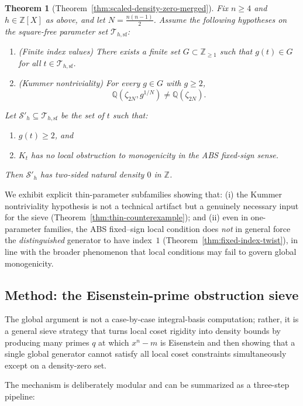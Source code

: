 \documentclass[11pt,letterpaper]{amsart}
\newcommand{\Z}{\mathbb{Z}}
\newcommand{\Q}{\mathbb{Q}}
\theoremstyle{plain}
\newtheorem{theorem}{Theorem}[section]
\theoremstyle{definition}
\theoremstyle{remark}
\theoremstyle{plain}
\begin{document}
\begin{theorem}[Theorem~\ref{thm:scaled-density-zero-merged}]
Fix $n\ge 4$ and $h\in\Z[X]$ as above, and let $N=\frac{n(n-1)}2$.
Assume the following hypotheses on the square-free parameter set $\mathcal{T}_{h,\mathrm{sf}}$:
\begin{enumerate}[label=\textup{(\alph*)}]
\item \textup{(Finite index values)} There exists a finite set $G\subset\Z_{\ge1}$ such that
$g(t)\in G$ for all $t\in\mathcal{T}_{h,\mathrm{sf}}$.
\item \textup{(Kummer nontriviality)} For every $g\in G$ with $g\ge 2$,
\[
\Q(\zeta_{2N},g^{1/N})\neq \Q(\zeta_{2N}).
\]
\end{enumerate}
Let $\mathcal{S}'_{h}\subseteq\mathcal{T}_{h,\mathrm{sf}}$ be the set of $t$ such that:
\begin{enumerate}[label=\textup{(\roman*)}]
\item $g(t)\ge 2$, and
\item $K_t$ has \emph{no} local obstruction to monogenicity in the \textsc{ABS} fixed-sign sense.
\end{enumerate}
Then $\mathcal{S}'_{h}$ has two-sided natural density $0$ in $\Z$.
\end{theorem}

We exhibit explicit thin-parameter subfamilies showing that: (i) the Kummer nontriviality hypothesis is not a technical artifact but a genuinely necessary input for the sieve (Theorem~\ref{thm:thin-counterexample}); and (ii) even in one-parameter families, the \textsc{ABS} fixed--sign local condition does \emph{not} in general force the \emph{distinguished} generator to have index~$1$ (Theorem~\ref{thm:fixed-index-twist}), in line with the broader phenomenon that local conditions may fail to govern global monogenicity.


 

\subsection{Method: the Eisenstein-prime obstruction sieve}
The global argument is not a case-by-case integral-basis computation; rather, it is a general sieve strategy that turns local coset rigidity into density bounds by producing many primes $q$ at which $x^n-m$ is Eisenstein and then showing that a single global generator cannot satisfy all local coset constraints simultaneously except on a density-zero set.

The mechanism is deliberately modular and can be summarized as a three-step pipeline:
\end{document}
